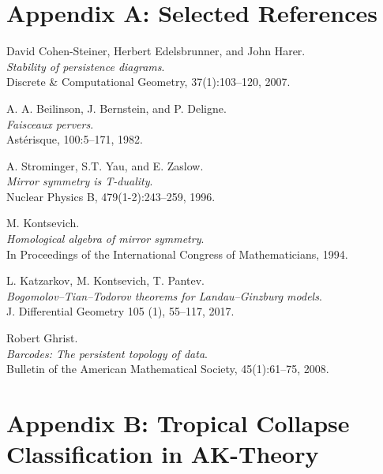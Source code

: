 \documentclass[11pt]{article}
\begin{document}

\section*{Appendix A: Selected References}

\begin{thebibliography}{9}

David Cohen-Steiner, Herbert Edelsbrunner, and John Harer.\\
\textit{Stability of persistence diagrams}.\\
Discrete \& Computational Geometry, 37(1):103--120, 2007.

A. A. Beilinson, J. Bernstein, and P. Deligne.\\
\textit{Faisceaux pervers}.\\
Ast\'erisque, 100:5–171, 1982.

A. Strominger, S.T. Yau, and E. Zaslow.\\
\textit{Mirror symmetry is T-duality}.\\
Nuclear Physics B, 479(1-2):243–259, 1996.

M. Kontsevich.\\
\textit{Homological algebra of mirror symmetry}.\\
In Proceedings of the International Congress of Mathematicians, 1994.

L. Katzarkov, M. Kontsevich, T. Pantev.\\
\textit{Bogomolov–Tian–Todorov theorems for Landau–Ginzburg models}.\\
J. Differential Geometry 105 (1), 55–117, 2017.

Robert Ghrist.\\
\textit{Barcodes: The persistent topology of data}.\\
Bulletin of the American Mathematical Society, 45(1):61--75, 2008.

\end{thebibliography}


\section*{Appendix B: Tropical Collapse Classification in AK-Theory}
\end{document}
